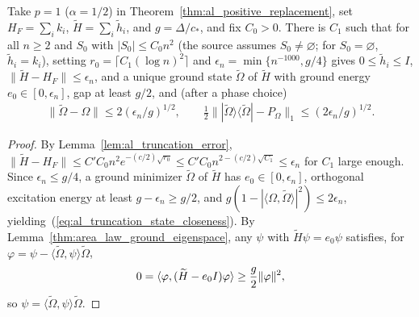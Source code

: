 \begin{lemma}
    \label{thm:al_truncation}
    \leanok
    Take $p=1$ ($\alpha=1/2$) in Theorem~\ref{thm:al_positive_replacement}, set
    $H_F=\sum_i k_i$, $\widetilde H=\sum_i\widetilde h_i$, and $g=\Delta/c_*$,
    and fix $C_0>0$. There is $C_1$ such that for all $n\ge2$ and $S_0$ with
    $|S_0|\le C_0n^2$ (the source assumes $S_0\ne\varnothing$; for
    $S_0=\varnothing$, $\widetilde h_i=k_i$), setting
    $r_0=\lceil C_1(\log n)^2\rceil$ and $\epsilon_n=\min\{n^{-1000},g/4\}$
    gives $0\le\widetilde h_i\le I$, $\|\widetilde H-H_F\|\le\epsilon_n$, and a
    unique ground state $\widetilde\Omega$ of $\widetilde H$ with ground energy
    $e_0\in[0,\epsilon_n]$, gap at least $g/2$, and (after a phase choice)
    \begin{align}
        \|\widetilde\Omega-\Omega\|\le2(\epsilon_n/g)^{1/2},\qquad
        \frac12\||\widetilde\Omega\rangle\langle\widetilde\Omega|-P_\Omega\|_1
        \le(2\epsilon_n/g)^{1/2}.
        \label{eq:al_truncation_state_closeness}
    \end{align}
\end{lemma}
\begin{proof}\leanok
    By Lemma~\ref{lem:al_truncation_error},
    $\|\widetilde H-H_F\|\le C'C_0n^2e^{-(c/2)\sqrt{r_0}}\le C'C_0n^{2-(c/2)\sqrt{C_1}}\le\epsilon_n$
    for $C_1$ large enough. Since $\epsilon_n\le g/4$, a ground minimizer
    $\widetilde\Omega$ of $\widetilde H$ has $e_0\in[0,\epsilon_n]$, orthogonal
    excitation energy at least $g-\epsilon_n\ge g/2$, and
    $g(1-|\langle\Omega,\widetilde\Omega\rangle|^2)\le2\epsilon_n$, yielding~(\ref{eq:al_truncation_state_closeness}).
    By Lemma~\ref{thm:area_law_ground_eigenspace}, any $\psi$ with
    $\widetilde H\psi=e_0\psi$ satisfies, for
    $\varphi=\psi-\langle\widetilde\Omega,\psi\rangle\widetilde\Omega$,
    \begin{align}
        0=\langle\varphi,(\widetilde H-e_0I)\varphi\rangle
        \ge\frac g2\|\varphi\|^2,
        \notag
    \end{align}
    so $\psi=\langle\widetilde\Omega,\psi\rangle\widetilde\Omega$.
\end{proof}

